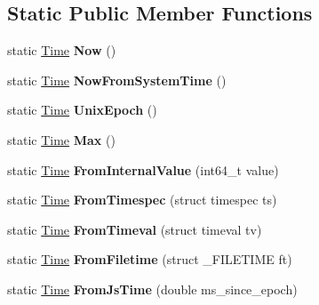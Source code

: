 \subsection*{Static Public Member Functions}
\begin{DoxyCompactItemize}
\item 
static \hyperlink{classv8_1_1base_1_1_time}{Time} {\bfseries Now} ()\hypertarget{classv8_1_1base_1_1_time_a485c6079d0a94b6e93cc931b2857382d}{}\label{classv8_1_1base_1_1_time_a485c6079d0a94b6e93cc931b2857382d}

\item 
static \hyperlink{classv8_1_1base_1_1_time}{Time} {\bfseries Now\+From\+System\+Time} ()\hypertarget{classv8_1_1base_1_1_time_a5c4a31685f5096e8597736c68b0969a7}{}\label{classv8_1_1base_1_1_time_a5c4a31685f5096e8597736c68b0969a7}

\item 
static \hyperlink{classv8_1_1base_1_1_time}{Time} {\bfseries Unix\+Epoch} ()\hypertarget{classv8_1_1base_1_1_time_a44f04cdf4cf07b26ad5073825d82d8cc}{}\label{classv8_1_1base_1_1_time_a44f04cdf4cf07b26ad5073825d82d8cc}

\item 
static \hyperlink{classv8_1_1base_1_1_time}{Time} {\bfseries Max} ()\hypertarget{classv8_1_1base_1_1_time_a84ad862b925d42ab2d01ff734d0ab209}{}\label{classv8_1_1base_1_1_time_a84ad862b925d42ab2d01ff734d0ab209}

\item 
static \hyperlink{classv8_1_1base_1_1_time}{Time} {\bfseries From\+Internal\+Value} (int64\+\_\+t value)\hypertarget{classv8_1_1base_1_1_time_ad6526a598d90614a51852dc2591b0a5a}{}\label{classv8_1_1base_1_1_time_ad6526a598d90614a51852dc2591b0a5a}

\item 
static \hyperlink{classv8_1_1base_1_1_time}{Time} {\bfseries From\+Timespec} (struct timespec ts)\hypertarget{classv8_1_1base_1_1_time_a1f4311b50b1e6d80974dc3c1d485c6e7}{}\label{classv8_1_1base_1_1_time_a1f4311b50b1e6d80974dc3c1d485c6e7}

\item 
static \hyperlink{classv8_1_1base_1_1_time}{Time} {\bfseries From\+Timeval} (struct timeval tv)\hypertarget{classv8_1_1base_1_1_time_af4de5e39ec25ca6ba75561e9792be776}{}\label{classv8_1_1base_1_1_time_af4de5e39ec25ca6ba75561e9792be776}

\item 
static \hyperlink{classv8_1_1base_1_1_time}{Time} {\bfseries From\+Filetime} (struct \+\_\+\+F\+I\+L\+E\+T\+I\+ME ft)\hypertarget{classv8_1_1base_1_1_time_a78a0ea40386d260073005c1cb67bee8d}{}\label{classv8_1_1base_1_1_time_a78a0ea40386d260073005c1cb67bee8d}

\item 
static \hyperlink{classv8_1_1base_1_1_time}{Time} {\bfseries From\+Js\+Time} (double ms\+\_\+since\+\_\+epoch)\hypertarget{classv8_1_1base_1_1_time_a77f4ff7a1c48f5d1d591946118cdb8ca}{}\label{classv8_1_1base_1_1_time_a77f4ff7a1c48f5d1d591946118cdb8ca}

\end{DoxyCompactItemize}
